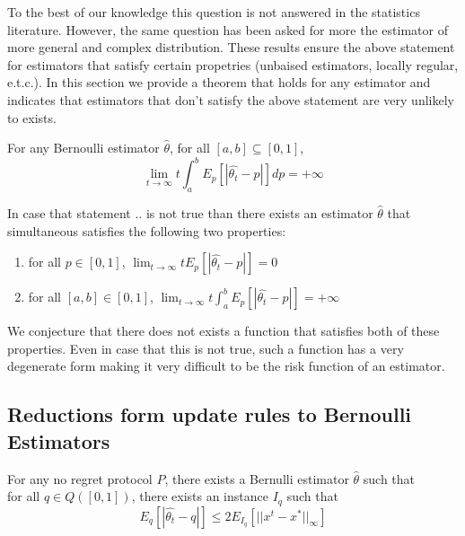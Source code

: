 \noindent To the best of our knowledge this question is not answered in the statistics literature. However, the same question has been asked for more the estimator of more general and complex distribution. These results ensure the above statement for estimators that satisfy certain propetries (unbaised estimators, locally regular, e.t.c.). In this section we provide a theorem that holds for any estimator and indicates that estimators that don't satisfy the above statement are very unlikely to exists.

\begin{theorem}
For any Bernoulli estimator $\hat{\theta}$, for all $[a,b] \subseteq [0,1]$,
$$ \lim_{t \to \infty}t \int_{a}^{b}E_p[|\hat{\theta_t} -p|]dp = +\infty$$
\end{theorem} In case that statement .. is not true than there exists an estimator $\hat{\theta}$ that simultaneous satisfies the following two properties:
\begin{enumerate}
 \item for all $p\in[0,1]$, $\lim_{t \to \infty}t E_p[|\hat{\theta_t} - p|]=0$
 \item for all $[a,b] \in [0,1]$, $\lim_{t \to \infty}t \int_a^b E_p[|\hat{\theta_t} - p|]=+\infty$
\end{enumerate}

We conjecture that there does not exists a function that satisfies both of these properties. Even in case that this is not true, such a function has a very degenerate form making it very difficult to be the risk function of an estimator.  

\subsection{Reductions form update rules to Bernoulli Estimators}

\begin{lemma}
For any no regret protocol $P$, there exists a Bernulli estimator $\hat{\theta}$ such that\\
for all $q \in Q([0,1])$, there exists an instance $I_q$ such that $$E_q[|\hat{\theta_t} - q|] \leq 2E_{I_q}[||x^t-x^*||_{\infty}]$$
\end{lemma}

